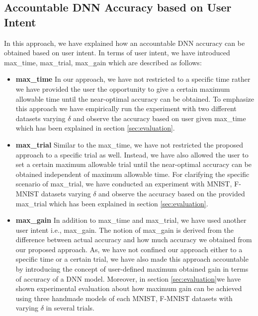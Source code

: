 \subsection{Accountable DNN Accuracy based on User Intent}
In this approach, we have explained how an accountable DNN accuracy can be obtained based on user intent. In terms of user intent, we have introduced max\_time, max\_trial, max\_gain which are described as follows:
\begin{itemize}
	\item \textbf{max\_time} In our approach, we have not restricted to a specific time rather we have provided the user the opportunity to give a certain maximum allowable time until the near-optimal accuracy can be obtained. To emphasize this approach we have empirically run the experiment with two different datasets varying $\delta$ and observe the accuracy based on user given max\_time which has been explained in section \ref{sec:evaluation}. 
	\item \textbf{max\_trial} Similar to the max\_time, we have not restricted the proposed approach to a specific trial as well. Instead, we have also allowed the user to set a certain maximum allowable trial until the near-optimal accuracy can be obtained independent of maximum allowable time. For clarifying the specific scenario of max\_trial, we have conducted an experiment with MNIST, F-MNIST datasets varying $\delta$ and observe the accuracy based on the provided max\_trial which has been explained in section \ref{sec:evaluation}.
	\item \textbf{max\_gain} In addition to max\_time and max\_trial, we have used another user intent i.e., max\_gain. The notion of max\_gain is derived from the difference between actual accuracy and how much accuracy we obtained from our proposed approach. As, we have not confined our approach either to a specific time or a certain trial, we have also made this approach accountable by introducing the concept of user-defined maximum obtained gain in terms of accuracy of a DNN model. Moreover, in section \ref{sec:evaluation}we have shown experimental evaluation about how maximum gain can be achieved using three handmade models of each MNIST, F-MNIST datasets with varying $\delta$ in several trials.          
\end{itemize}
